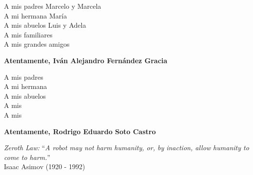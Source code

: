 \thispagestyle{fancy}

\vspace{5cm}

\begin{flushright}
{
{\sc  A mis padres Marcelo y Marcela}\\
{\sc  A mi hermana María}\\
{\sc  A mis abuelos Luis y Adela}\\
{\sc  A mis familiares}\\
{\sc  A mis grandes amigos}\\
}
\end{flushright}
\begin{flushright}
{
{\sc \textbf{Atentamente, Iván Alejandro Fernández Gracia}} \\
}
\end{flushright}

\begin{flushright}
{
{\sc  A mis padres }\\
{\sc  A mi hermana }\\
{\sc  A mis abuelos}\\
{\sc  A mis }\\
{\sc  A mis }\\
}
\end{flushright}
\begin{flushright}
{
{\sc \textbf{Atentamente, Rodrigo Eduardo Soto Castro}} \\
}
\end{flushright}







\vfill
\begin{centering}
{{\textit{Zeroth Law:} ``{\it A robot may not harm humanity, or, by inaction, allow humanity to come to harm.}''}\\
{\sc Isaac Asimov (1920 - 1992)}\\}
\end{centering}



